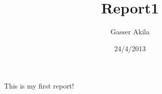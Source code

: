 \documentclass{article}
\title{Report1}
\author{Gasser Akila}
\date{24/4/2013}
\begin{document}
\maketitle

This is my first report!
\end{document}
